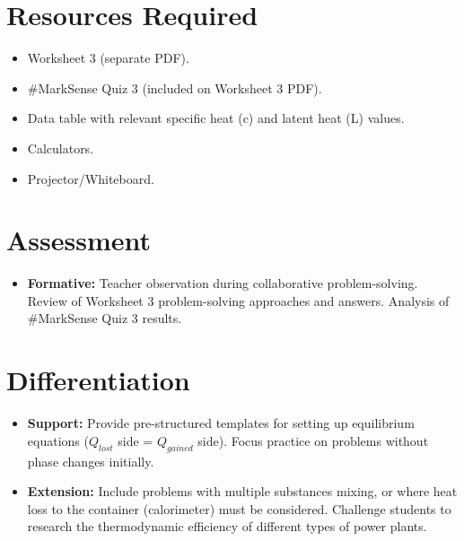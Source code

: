 \documentclass[11pt, a4paper]{article}
\begin{document}
\section*{Resources Required}
\begin{itemize}
    \item Worksheet 3 (separate PDF).
    \item \#MarkSense Quiz 3 (included on Worksheet 3 PDF).
    \item Data table with relevant specific heat (c) and latent heat (L) values.
    \item Calculators.
    \item Projector/Whiteboard.
\end{itemize}

\section*{Assessment}
\begin{itemize}
    \item \textbf{Formative:} Teacher observation during collaborative problem-solving. Review of Worksheet 3 problem-solving approaches and answers. Analysis of \#MarkSense Quiz 3 results.
\end{itemize}

\section*{Differentiation}
\begin{itemize}
    \item \textbf{Support:} Provide pre-structured templates for setting up equilibrium equations ($Q_{lost}$ side = $Q_{gained}$ side). Focus practice on problems without phase changes initially.
    \item \textbf{Extension:} Include problems with multiple substances mixing, or where heat loss to the container (calorimeter) must be considered. Challenge students to research the thermodynamic efficiency of different types of power plants.
\end{itemize}
\end{document}

